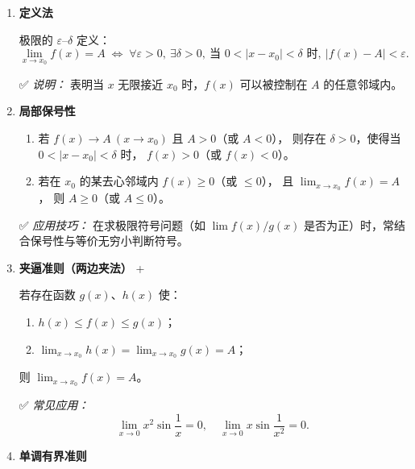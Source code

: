 \begin{enumerate}
    \item \textbf{定义法} \DTwoTwo

          极限的 $\varepsilon$–$\delta$ 定义：
          \[
              \lim_{x \to x_0} f(x) = A
              \;\Leftrightarrow\;
              \forall \varepsilon > 0,\ \exists \delta > 0,\
              \text{当 } 0 < |x - x_0| < \delta \text{ 时},\ |f(x) - A| < \varepsilon.
          \]

          ✅ \textit{说明：}
          表明当 $x$ 无限接近 $x_0$ 时，$f(x)$ 可以被控制在 $A$ 的任意邻域内。

    \item \textbf{局部保号性} \DTwoTwo

          \begin{enumerate}
              \item 若 $f(x) \to A \ (x \to x_0)$ 且 $A > 0$（或 $A < 0$），
                    则存在 $\delta > 0$，使得当 $0 < |x - x_0| < \delta$ 时，
                    $f(x) > 0$（或 $f(x) < 0$）。

              \item 若在 $x_0$ 的某去心邻域内 $f(x) \ge 0$（或 $\le 0$），
                    且 $\displaystyle \lim_{x \to x_0} f(x) = A$，
                    则 $A \ge 0$（或 $A \le 0$）。
          \end{enumerate}

          ✅ \textit{应用技巧：}
          在求极限符号问题（如 $\lim f(x)/g(x)$ 是否为正）时，常结合保号性与等价无穷小判断符号。

    \item \textbf{夹逼准则（两边夹法）} \DTwoTwo+\DTwoThree

          若存在函数 $g(x)$、$h(x)$ 使：
          \begin{enumerate}
              \item $h(x) \le f(x) \le g(x)$；
              \item $\displaystyle \lim_{x \to x_0} h(x) = \lim_{x \to x_0} g(x) = A$；
          \end{enumerate}
          则 $\displaystyle \lim_{x \to x_0} f(x) = A$。

          ✅ \textit{常见应用：}
          \[
              \lim_{x \to 0} x^2 \sin\frac{1}{x} = 0, \quad
              \lim_{x \to 0} x \sin\frac{1}{x^2} = 0.
          \]

    \item \textbf{单调有界准则} \DTwoThree


\end{enumerate}
